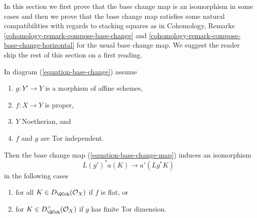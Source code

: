 \medskip\noindent
In this section we first prove that the base change map is an isomorphism
in some cases and then we prove that the base change map satisfies
some natural compatibilities with regards to stacking squares as in
Cohomology, Remarks \ref{cohomology-remark-compose-base-change} and
\ref{cohomology-remark-compose-base-change-horizontal} for the usual
base change map. We suggest the reader skip the rest of this section
on a first reading.

\begin{lemma}
\label{lemma-more-base-change}
In diagram (\ref{equation-base-change}) assume
\begin{enumerate}
\item $g : Y' \to Y$ is a morphism of affine schemes,
\item $f : X \to Y$ is proper,
\item $Y$ Noetherian, and
\item $f$ and $g$ are Tor independent.
\end{enumerate}
Then the base change map (\ref{equation-base-change-map}) induces an
isomorphism
$$
L(g')^*a(K) \longrightarrow a'(Lg^*K)
$$
in the following cases
\begin{enumerate}
\item for all $K \in D_\QCoh(\mathcal{O}_X)$ if $f$ is flat, or
\item for $K \in D_\QCoh^+(\mathcal{O}_X)$ if $g$ has finite Tor dimension.
\end{enumerate}
\end{lemma}

